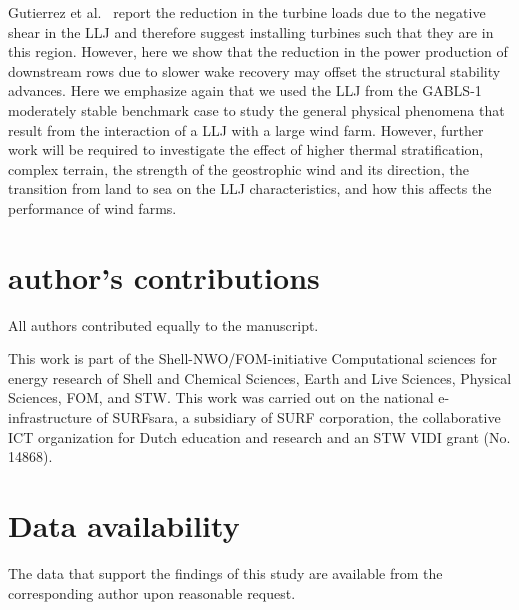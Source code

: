 \documentclass[%
 aip,
 amsmath,amssymb,
preprint,%
author-numerical,%
]{revtex4-1}
\begin{document}
Gutierrez et al.\ \cite{gut17} report the reduction in the turbine loads due to the negative shear in the LLJ and therefore suggest installing turbines such that they are in this region. However, here we show that the reduction in the power production of downstream rows due to slower wake recovery may offset the structural stability advances. Here we emphasize again that we used the LLJ from the GABLS-1 moderately stable benchmark case to study the general physical phenomena that result from the interaction of a LLJ with a large wind farm. However, further work will be required to investigate the effect of higher thermal stratification, complex terrain, the strength of the geostrophic wind and its direction, the transition from land to sea on the LLJ characteristics, and how this affects the performance of wind farms.

\section*{author's contributions}
\noindent All authors contributed equally to the manuscript.  

\begin{acknowledgments}
This work is part of the Shell-NWO/FOM-initiative Computational sciences for energy research of Shell and Chemical Sciences, Earth and Live Sciences, Physical Sciences, FOM, and STW. This work was carried out on the national e-infrastructure of SURFsara, a subsidiary of SURF corporation, the collaborative ICT organization for Dutch education and research and an STW VIDI grant (No. 14868).
\end{acknowledgments}

\section*{Data availability}
\noindent The data that support the findings of this study are available from the corresponding author upon reasonable request.

\end{document}
